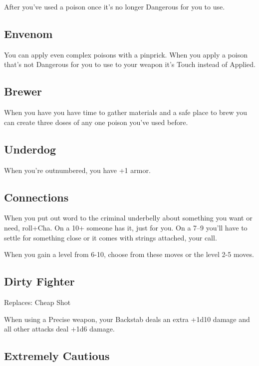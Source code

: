After you've used a poison once it's no longer Dangerous for you to use.

 
\subsection{Envenom}   
 

You can apply even complex poisons with a pinprick. When you apply a poison that's not Dangerous for you to use to your weapon it's Touch instead of Applied.

 
\subsection{Brewer}   
 

When you have you have time to gather materials and a safe place to brew you can create three doses of any one poison you've used before.

 
\subsection{Underdog}   
 

When you're outnumbered, you have +1 armor.

 
\subsection{Connections}   
 

When you put out word to the criminal underbelly about something you want or need, roll+Cha. On a 10+ someone has it, just for you. On a 7–9 you'll have to settle for something close or it comes with strings attached, your call.

 
\startInstructions
When you gain a level from 6-10, choose from these moves or the level 2-5 moves.
\stopInstructions
 
\subsection{Dirty Fighter}    
 

Replaces: Cheap Shot

 

When using a Precise weapon, your Backstab deals an extra +1d10 damage and all other attacks deal +1d6 damage.

 
\subsection{Extremely Cautious}    
 

